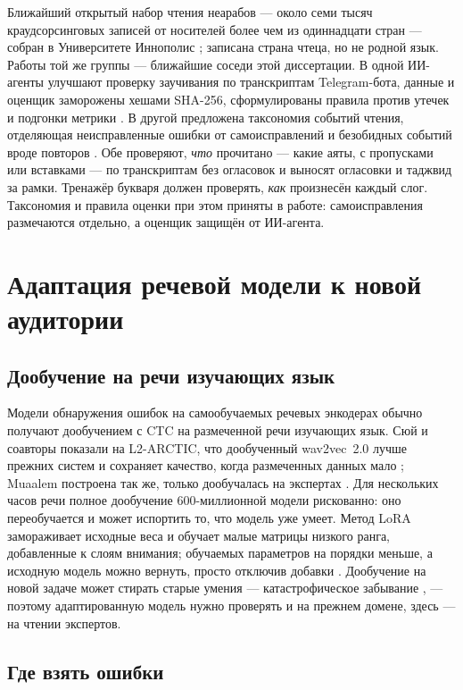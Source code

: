 Ближайший открытый набор чтения неарабов --- около семи тысяч краудсорсинговых записей от носителей более
чем из одиннадцати стран --- собран в Университете Иннополис \cite{SRC-032}; записана страна чтеца, но не
родной язык. Работы той же группы --- ближайшие соседи этой диссертации. В одной ИИ-агенты
улучшают проверку заучивания по транскриптам Telegram-бота, данные и оценщик заморожены хешами SHA-256,
сформулированы правила против утечек и подгонки метрики \cite{SRC-067,SRC-069}. В другой предложена
таксономия событий чтения, отделяющая неисправленные ошибки от самоисправлений и безобидных событий вроде
повторов \cite{SRC-068}. Обе проверяют, \emph{что} прочитано --- какие аяты, с пропусками или вставками ---
по транскриптам без огласовок и выносят огласовки и таджвид за рамки. Тренажёр букваря должен проверять,
\emph{как} произнесён каждый слог. Таксономия и правила оценки при этом приняты в работе: самоисправления
размечаются отдельно, а оценщик защищён от ИИ-агента.

\section{Адаптация речевой модели к новой аудитории}\label{sec:lr-adapt}

\subsection{Дообучение на речи изучающих язык}

Модели обнаружения ошибок на самообучаемых речевых энкодерах обычно получают дообучением с CTC на
размеченной речи изучающих язык. Сюй и соавторы показали на L2-ARCTIC, что дообученный wav2vec~2.0 лучше
прежних систем и сохраняет качество, когда размеченных данных мало \cite{SRC-116}; Muaalem построена так
же, только дообучалась на экспертах \cite{SRC-002}. Для нескольких часов речи полное дообучение
600-миллионной модели рискованно: оно переобучается и может испортить то, что модель уже умеет. Метод
LoRA замораживает исходные веса и обучает малые матрицы низкого ранга, добавленные к слоям внимания;
обучаемых параметров на порядки меньше, а исходную модель можно вернуть, просто отключив добавки
\cite{SRC-111}. Дообучение на новой задаче может стирать старые умения --- катастрофическое забывание
\cite{SRC-118}, --- поэтому адаптированную модель нужно проверять и на прежнем домене, здесь --- на чтении
экспертов.

\subsection{Где взять ошибки}

